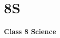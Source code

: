 \label{3 C8 Science}
    \section{8S}
    \begin{frame}
    \begin{center}
    \begin{Huge}
        \textbf{Class 8 Science}
    \end{Huge}
    \end{center}
    \end{frame}
 
    